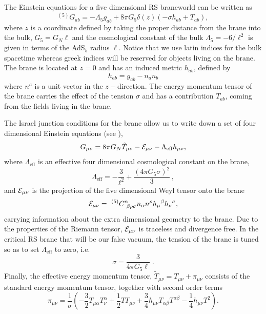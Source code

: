 \documentclass[aps,12pt,prd,superscriptaddress,preprintnumbers, 
	amssymb,
	amsmath,
	notitlepage,
	longbibliography,
	nofootinbib]{revtex4-1}
\begin{document}
The Einstein equations for a five dimensional RS braneworld 
can be written as
\begin{equation}
^{(5)}G_{ab} = - \Lambda_5 g_{ab}  + 8\pi G_5  \delta(z) ( -\sigma h_{ab} + T_{ab}) ,
\end{equation}
where $z$ is a coordinate defined by taking the proper distance from
the brane into the bulk, $G_5 = G_N \ell$ and the cosmological constant of the 
bulk $\Lambda_5=-6/\ell^2$ is given in terms of the AdS$_5$ radius $\ell$. 
Notice that we use latin indices for the bulk spacetime whereas 
greek indices will be reserved for objects living on the brane. 
The brane is located at $z=0$ and has an induced metric $h_{ab}$, defined by
\begin{equation}
h_{ab}= g_{ab} - n_a n_b
\end{equation}
where $n^a$ is a unit vector in the $z-$direction. The energy momentum 
tensor of the brane carries the effect of the tension $\sigma$ and has a 
contribution $T_{ab}$, coming from the fields living in the brane.

The Israel junction conditions for the brane allow us to 
write down a set of four dimensional Einstein equations (see \cite{Shiromizu:1999wj}),
\begin{equation}
G_{\mu\nu} = 8 \pi G_N \tilde{T}_{\mu\nu} - {\cal E}_{\mu\nu}
- \Lambda_{\text{eff}} h_{\mu\nu},
\label{effeins}
\end{equation}
where $\Lambda_{\text{eff}}$ is an effective four dimensional cosmological 
constant on the brane, 
\begin{equation}
\Lambda_{\text{eff}} = -\frac{3}{\ell^2} 
+ \frac{(4\pi G_5\sigma)^2}3 \,,
\end{equation}
and ${\cal E}_{\mu\nu}$ is the projection of the five dimensional 
Weyl tensor onto the brane
\begin{equation}
{\cal E}_{\mu\nu} = ~^{(5)}C^\alpha_{~\beta\rho\sigma} n_\alpha 
n^\rho h_\mu{}^\beta h_\nu{}^\sigma ,
\end{equation}
carrying information about the extra dimensional geometry to the brane.
Due to the properties of the Riemann tensor, ${\cal E}_{\mu\nu}$ 
is traceless and divergence free.
In the critical RS brane that will be our false vacuum, the tension of the brane
is tuned so as to set $\Lambda_{\text{eff}}$ to zero, i.e.\ 
\begin{equation}
\sigma=\frac{3}{4\pi G_5 \ell} \; .
\end{equation} 
Finally, the effective energy momentum tensor, $\tilde{T}_{\mu\nu}
= T_{\mu\nu} + \pi_{\mu\nu} $ consists of the standard energy momentum
tensor, together with second order terms 
\begin{equation}
\pi_{\mu\nu} = \frac{1}{ \sigma} \left( -\frac32 T_{\mu\alpha}T^\alpha_\nu + 
\frac12 T T_{\mu\nu} + \frac34 h_{\mu\nu} T_{\alpha\beta} 
T^{\alpha\beta} - \frac14 h_{\mu\nu} T^2 \right).
\end{equation}  
\end{document}
